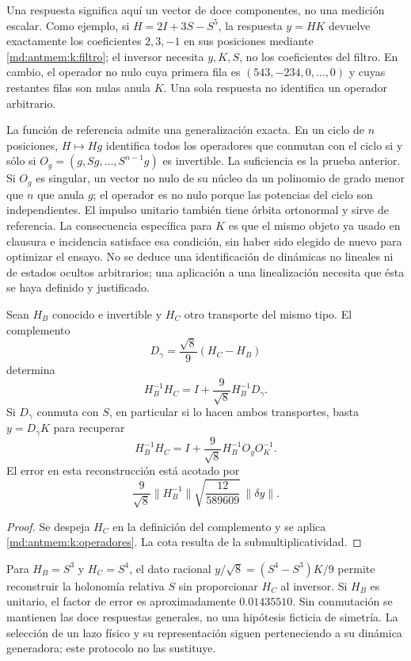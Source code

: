 Una respuesta significa aquí un vector de doce componentes, no una
medición escalar. Como ejemplo, si \(H=2I+3S-S^5\), la respuesta
\(y=HK\) devuelve exactamente los coeficientes \(2,3,-1\) en sus
posiciones mediante \eqref{md:antmem:k:filtro}; el inversor necesita \(y,K,S\),
no los coeficientes del filtro. En cambio, el operador no nulo cuya primera
fila es \((543,-234,0,\ldots,0)\) y cuyas restantes filas son nulas
anula \(K\). Una sola respuesta no identifica un operador arbitrario.

La función de referencia admite una generalización exacta. En un ciclo de
\(n\) posiciones, \(H\mapsto Hg\) identifica todos los operadores
que conmutan con el ciclo si y sólo si
\(O_g=(g,Sg,\ldots,S^{n-1}g)\) es invertible. La suficiencia es la
prueba anterior. Si \(O_g\) es singular, un vector no nulo de su núcleo
da un polinomio de grado menor que \(n\) que anula \(g\); el operador
es no nulo porque las potencias del ciclo son independientes. El impulso
unitario también tiene órbita ortonormal y sirve de referencia. La
consecuencia específica para \(K\) es que el mismo objeto ya usado en
clausura e incidencia satisface esa condición, sin haber sido elegido de
nuevo para optimizar el ensayo. No se deduce una identificación de
dinámicas no lineales ni de estados ocultos arbitrarios; una aplicación a
una linealización necesita que ésta se haya definido y justificado.

\begin{corollary}
\label{md:antmem:k:holonomia}
Sean \(H_B\) conocido e invertible y \(H_C\) otro transporte del
mismo tipo. El complemento
\[
 D_\gamma=\frac{\sqrt8}{9}(H_C-H_B)
\]
determina
\[
 H_B^{-1}H_C=I+\frac9{\sqrt8}H_B^{-1}D_\gamma.
\]
Si \(D_\gamma\) conmuta con \(S\), en particular si lo hacen ambos
transportes, basta \(y=D_\gamma K\) para recuperar
\begin{equation}
 H_B^{-1}H_C
 =I+\frac9{\sqrt8}H_B^{-1}O_yO_K^{-1}.
 \label{md:antmem:k:holonomia-una-respuesta}
\end{equation}
El error en esta reconstrucción está acotado por
\[
 \frac9{\sqrt8}\|H_B^{-1}\|
 \sqrt{\frac{12}{589609}}\,\|\delta y\|.
\]
\end{corollary}
\begin{proof}
Se despeja \(H_C\) en la definición del complemento y se aplica
\cref{md:antmem:k:operadores}. La cota resulta de la submultiplicatividad.
\end{proof}

Para \(H_B=S^3\) y \(H_C=S^4\), el dato racional
\(y/\sqrt8=(S^4-S^3)K/9\) permite reconstruir la holonomía relativa
\(S\) sin proporcionar \(H_C\) al inversor. Si \(H_B\) es
unitario, el factor de error es aproximadamente \(0.01435510\). Sin
conmutación se mantienen las doce respuestas generales, no una hipótesis
ficticia de simetría. La selección de un lazo físico y su representación
siguen perteneciendo a su dinámica generadora; este protocolo no las
sustituye.

